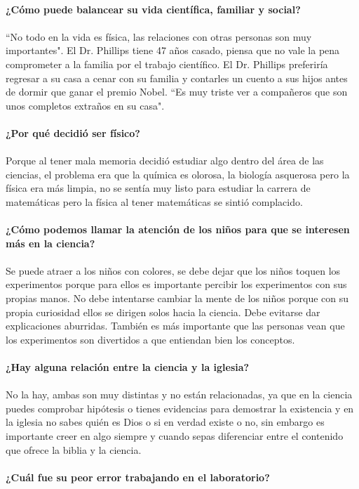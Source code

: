 \documentclass[10pt,letterpaper]{article}
\begin{document}
\\
\textbf{¿Cómo puede balancear su vida científica, familiar y social?}
\\
\\
``No todo en la vida es física, las relaciones con otras personas son muy importantes". El Dr. Phillips tiene 47 años casado, piensa que no vale la pena comprometer a la familia por el trabajo científico. El Dr. Phillips preferiría regresar a su casa a cenar con su familia y contarles un cuento a sus hijos antes de dormir que ganar el premio Nobel. ``Es muy triste ver a compañeros que son unos completos extraños en su casa".
\\
\\
\textbf{¿Por qué decidió ser físico?}
\\
\\
Porque al tener mala memoria decidió estudiar algo dentro del área de las ciencias, el problema era que la química es olorosa, la biología asquerosa pero la física era más limpia, no se sentía muy listo para estudiar la carrera de matemáticas pero la física al tener matemáticas se sintió complacido.
\\
\\
\textbf{¿Cómo podemos llamar la atención de los niños para que se interesen más en la ciencia?}
\\
\\
Se puede atraer a los niños con colores, se debe dejar que los niños toquen los experimentos porque para ellos es importante percibir los experimentos con sus propias manos. No debe intentarse cambiar la mente de los niños porque con su propia curiosidad ellos se dirigen solos hacia la ciencia. Debe evitarse dar explicaciones aburridas. También es más importante que las personas vean que los experimentos son divertidos a que entiendan bien los conceptos.
\\
\\
\textbf{¿Hay alguna relación entre la ciencia y la iglesia?}
\\
\\
No la hay, ambas son muy distintas y no están relacionadas, ya que en la ciencia puedes comprobar hipótesis o tienes evidencias para demostrar la existencia y en la iglesia no sabes quién es Dios o si en verdad existe o no, sin embargo es importante creer en algo siempre y cuando sepas diferenciar entre el contenido que ofrece la biblia y la ciencia.
\\
\\
\textbf{¿Cuál fue su peor error trabajando en el laboratorio?}
\end{document}
